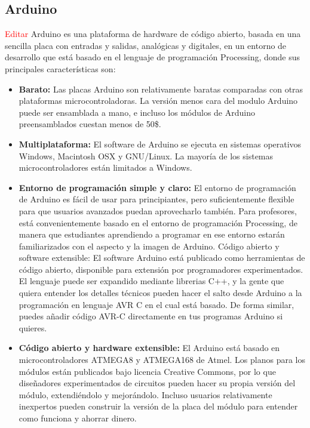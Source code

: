 \documentclass[12pt,a4paper]{article}
\begin{document}
 \subsection{Arduino}
 \textcolor{red}{Editar}
	Arduino\cite{ARDUINO} es una plataforma de hardware de código abierto, basada en una sencilla placa con entradas y salidas, analógicas y digitales, en un entorno de desarrollo que está basado en el lenguaje de programación Processing, donde sus principales características son:
\begin{itemize}
	\item \textbf{Barato:} Las placas Arduino son relativamente baratas comparadas con otras plataformas microcontroladoras. La versión menos cara del modulo Arduino puede ser ensamblada a mano, e incluso los módulos de Arduino preensamblados cuestan menos de 50\$.
	\item \textbf{Multiplataforma:} El software de Arduino se ejecuta en sistemas operativos Windows, Macintosh OSX y GNU/Linux. La mayoría de los sistemas microcontroladores están limitados a Windows.
\item \textbf{Entorno de programación simple y claro:} El entorno de programación de Arduino es fácil de usar para principiantes, pero suficientemente flexible para que usuarios avanzados puedan aprovecharlo también. Para profesores, está convenientemente basado en el entorno de programación Processing, de manera que estudiantes aprendiendo a programar en ese entorno estarán familiarizados con el aspecto y la imagen de Arduino.
Código abierto y software extensible: El software Arduino está publicado como herramientas de código abierto, disponible para extensión por programadores experimentados. El lenguaje puede ser expandido mediante librerias C++, y la gente que quiera entender los detalles técnicos pueden hacer el salto desde Arduino a la programación en lenguaje AVR C en el cual está basado. De forma similar, puedes añadir código AVR-C directamente en tus programas Arduino si quieres.
\item \textbf{Código abierto y hardware extensible:} El Arduino está basado en microcontroladores ATMEGA8 y ATMEGA168 de Atmel. Los planos para los módulos están publicados bajo licencia Creative Commons, por lo que diseñadores experimentados de circuitos pueden hacer su propia versión del módulo, extendiéndolo y mejorándolo. Incluso usuarios relativamente inexpertos pueden construir la versión de la placa del módulo para entender como funciona y ahorrar dinero.
\end{itemize}
\end{document}
